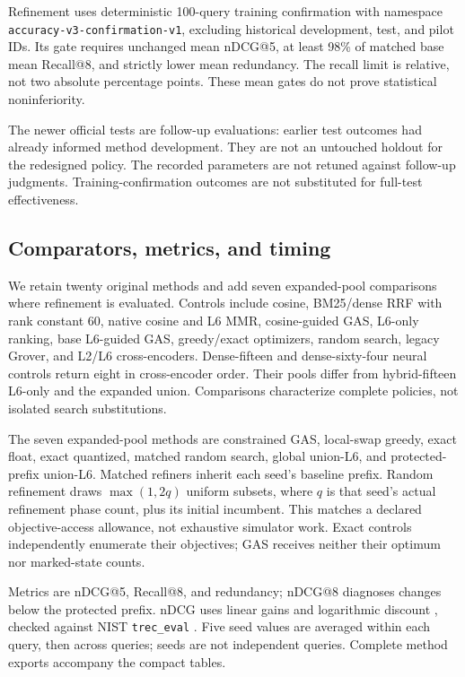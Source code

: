 \documentclass[conference]{IEEEtran}
\newcommand{\resultinput}[1]{}
\begin{document}
Refinement uses deterministic 100-query training confirmation with namespace \texttt{accuracy-v3-confirmation-v1}, excluding historical development, test, and pilot IDs. Its gate requires unchanged mean nDCG@5, at least 98\% of matched base mean Recall@8, and strictly lower mean redundancy. The recall limit is relative, not two absolute percentage points. These mean gates do not prove statistical noninferiority. \resultinput{protocol_exception.tex}

\resultinput{configuration_note.tex}
The newer official tests are follow-up evaluations: earlier test outcomes had already informed method development. They are not an untouched holdout for the redesigned policy. The recorded parameters are not retuned against follow-up judgments. Training-confirmation outcomes are not substituted for full-test effectiveness.

\subsection{Comparators, metrics, and timing}
We retain twenty original methods and add seven expanded-pool comparisons where refinement is evaluated. Controls include cosine, BM25/dense RRF with rank constant 60, native cosine and L6 MMR, cosine-guided GAS, L6-only ranking, base L6-guided GAS, greedy/exact optimizers, random search, legacy Grover, and L2/L6 cross-encoders. Dense-fifteen and dense-sixty-four neural controls return eight in cross-encoder order. Their pools differ from hybrid-fifteen L6-only and the expanded union. Comparisons characterize complete policies, not isolated search substitutions.

The seven expanded-pool methods are constrained GAS, local-swap greedy, exact float, exact quantized, matched random search, global union-L6, and protected-prefix union-L6. Matched refiners inherit each seed's baseline prefix. Random refinement draws \(\max(1,2q)\) uniform subsets, where \(q\) is that seed's actual refinement phase count, plus its initial incumbent. This matches a declared objective-access allowance, not exhaustive simulator work. Exact controls independently enumerate their objectives; GAS receives neither their optimum nor marked-state counts.

Metrics are nDCG@5, Recall@8, and redundancy; nDCG@8 diagnoses changes below the protected prefix. nDCG uses linear gains and logarithmic discount \cite{jarvelin2002gain}, checked against NIST \texttt{trec\_eval} \cite{trec_eval}. Five seed values are averaged within each query, then across queries; seeds are not independent queries. Complete method exports accompany the compact tables.
\end{document}
